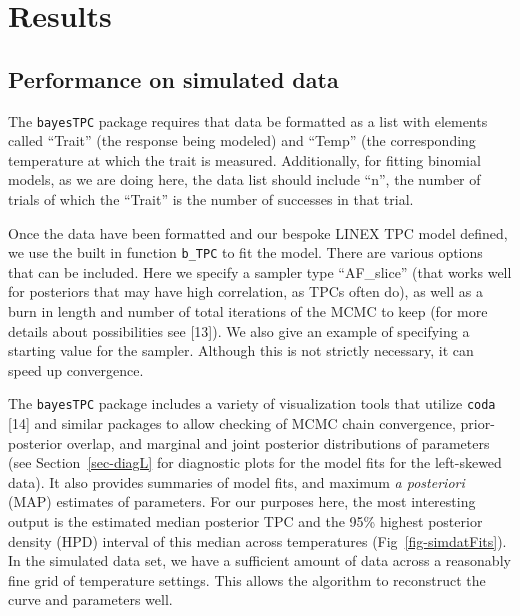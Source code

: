 \documentclass[
  11pt,
  letterpaper,
]{article}
\begin{document}
\section{Results}\label{results}

\subsection{Performance on simulated
data}\label{performance-on-simulated-data}

The \texttt{bayesTPC} package requires that data be formatted as a list
with elements called ``Trait'' (the response being modeled) and ``Temp''
(the corresponding temperature at which the trait is measured.
Additionally, for fitting binomial models, as we are doing here, the
data list should include ``n'', the number of trials of which the
``Trait'' is the number of successes in that trial.

Once the data have been formatted and our bespoke LINEX TPC model
defined, we use the built in function \texttt{b\_TPC} to fit the model.
There are various options that can be included. Here we specify a
sampler type ``AF\_slice'' (that works well for posteriors that may have
high correlation, as TPCs often do), as well as a burn in length and
number of total iterations of the MCMC to keep (for more details about
possibilities see {[}13{]}). We also give an example of specifying a
starting value for the sampler. Although this is not strictly necessary,
it can speed up convergence.

The \texttt{bayesTPC} package includes a variety of visualization tools
that utilize \texttt{coda} {[}14{]} and similar packages to allow
checking of MCMC chain convergence, prior-posterior overlap, and
marginal and joint posterior distributions of parameters (see
Section~\ref{sec-diagL} for diagnostic plots for the model fits for the
left-skewed data). It also provides summaries of model fits, and maximum
\emph{a posteriori} (MAP) estimates of parameters. For our purposes
here, the most interesting output is the estimated median posterior TPC
and the 95\% highest posterior density (HPD) interval of this median
across temperatures (Fig~\ref{fig-simdatFits}). In the simulated data
set, we have a sufficient amount of data across a reasonably fine grid
of temperature settings. This allows the algorithm to reconstruct the
curve and parameters well.
\end{document}
